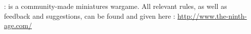 \begin{titlepage}
\begin{center}
\end{center}

\newpage

\thispagestyle{empty}

{\fontsize{12}{14.4}\selectfont

 :  is a community-made miniatures wargame. All relevant rules, as well as feedback and suggestions, can be found and given here :
\url{http://www.the-ninth-age.com/}


\vfill

}


\end{titlepage}

\restoregeometry